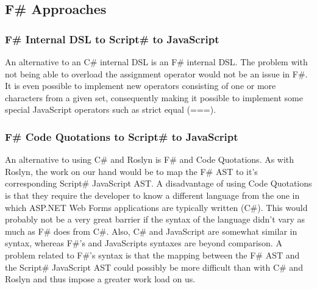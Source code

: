 

	\subsection{F\# Approaches} %
	\label{sub:f_approaches}
	
		\subsubsection{F\# Internal DSL to Script\# to JavaScript} %
		\label{ssub:f_internal_dsl_to_script_to_javascript}
			An alternative to an C\# internal DSL is an F\# internal DSL. The problem with not being able to overload the assignment operator would not be an issue in F\#. It is even possible to implement new operators consisting of one or more characters from a given set, consequently making it possible to implement some special JavaScript operators such as strict equal (===).

		\subsubsection{F\# Code Quotations to Script\# to JavaScript} %
		\label{ssub:f_code_quotations_to_script_to_javascript}
			An alternative to using C\# and Roslyn is F\# and Code Quotations. As with Roslyn, the work on our hand would be to map the F\# AST to it's corresponding Script\# JavaScript AST. A disadvantage of using Code Quotations is that they require the developer to know a different language from the one in which ASP.NET Web Forms applications are typically written (C\#). This would probably not be a very great barrier if the syntax of the language didn't vary as much as F\# does from C\#. Also, C\# and JavaScript are somewhat similar in syntax, whereas F\#'s and JavaScripts syntaxes are beyond comparison. A problem related to F\#'s syntax is that the mapping between the F\# AST and the Script\# JavaScript AST could possibly be more difficult than with C\# and Roslyn and thus impose a greater work load on us.





